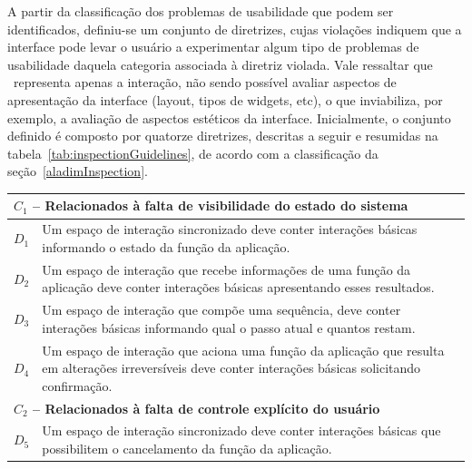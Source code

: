 A partir da  classificação dos problemas de usabilidade  que podem ser
identificados, definiu-se  um conjunto de  diretrizes, cujas violações
indiquem que  a interface  pode levar o  usuário a  experimentar algum
tipo  de  problemas  de  usabilidade  daquela  categoria  associada  à
diretriz  violada.  Vale  ressaltar que  \aladim\ representa  apenas a
interação,  não sendo  possível  avaliar aspectos  de apresentação  da
interface  (layout, tipos  de widgets,  etc), o  que  inviabiliza, por
exemplo,   a   avaliação   de   aspectos   estéticos   da   interface.
Inicialmente, o conjunto definido  é composto por quatorze diretrizes,
descritas         a        seguir        e         resumidas        na
tabela~\ref{tab:inspectionGuidelines},  de acordo com  a classificação
da seção~\ref{aladimInspection}.

\begin{table}[!htb]
  \small
  \begin{center}

    \begin{tabular}{|c|m{145mm}|} \hline

      \multicolumn{2}{|l|}{\bf  $C_1$  --   Relacionados  à  falta  de
        visibilidade do estado do sistema} \\ \hline

      $D_{1}$  &  Um  espaço  de interação  sincronizado  deve  conter
      interações básicas  informando o estado da  função da aplicação.
      \\ \hline

      $D_{2}$ & Um  espaço de interação que recebe  informações de uma
      função da aplicação  deve conter interações básicas apresentando
      esses resultados. \\ \hline

      $D_{3}$ & Um espaço de  interação que compõe uma sequência, deve
      conter  interações  básicas  informando  qual o  passo  atual  e
      quantos restam.  \\ \hline

      $D_{4}$  & Um  espaço  de  interação que  aciona  uma função  da
      aplicação  que resulta em  alterações irreversíveis  deve conter
      interações básicas solicitando confirmação.  \\ \hline
     
      \multicolumn{2}{|l|}{\bf  $C_2$  --   Relacionados  à  falta  de
        controle explícito do usuário} \\ \hline

      $D_{5}$  &  Um  espaço  de interação  sincronizado  deve  conter
      interações básicas que possibilitem  o cancelamento da função da
      aplicação.  \\ \hline


\end{tabular}
\end{center}
\end{table}
